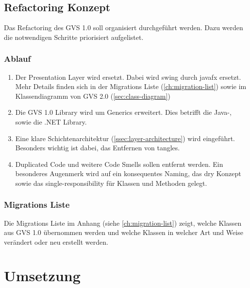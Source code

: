 \documentclass[11pt,a4paper,english,oneside]{book}
\numberwithin{equation}{chapter}
\begin{document}
	\section{Refactoring Konzept} \label{sec:refactoring-concept}
	Das Refactoring des GVS 1.0 soll organisiert durchgeführt werden. Dazu werden die notwendigen Schritte priorisiert aufgelistet.
		
	\subsection{Ablauf}\label{ssec:ablauf}
	\begin{enumerate}
		\item Der Presentation Layer wird ersetzt. Dabei wird \gls{swing} durch \gls{javafx} ersetzt. Mehr Details finden sich in der Migrations Liste (\ref{ch:migration-list}) sowie im Klassendiagramm von GVS 2.0 (\ref{sec:class-diagram})
		\item Die GVS 1.0 Library wird um Generics erweitert. Dies betrifft die Java-, sowie die .NET Library.
		\item Eine klare Schichtenarchitektur (\ref{ssec:layer-architecture}) wird eingeführt. Besonders wichtig ist dabei, das Entfernen von \gls{tangle}s.
		\item Duplicated Code und weitere Code Smells sollen entfernt werden. Ein besonderes Augenmerk wird auf ein konsequentes Naming, das \gls{dry} Konzept sowie das \gls{single-responsibility} für Klassen und Methoden gelegt.
	\end{enumerate}

	\subsection{Migrations Liste}
	\label{ssec:class-refactroing-list}
	Die Migrations Liste im Anhang (siehe \ref{ch:migration-list}) zeigt, welche Klassen aus GVS 1.0 übernommen werden und welche Klassen in welcher Art und Weise verändert oder neu erstellt werden.

	
	\chapter{Umsetzung} \label{ch:umsetzung}
		
\end{document}
